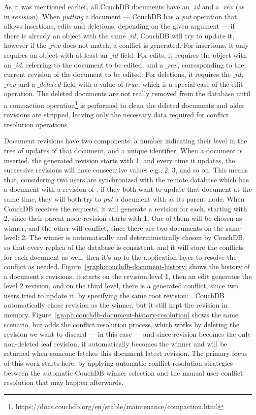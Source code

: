 As it was mentioned earlier, all CouchDB documents have an $\_id$ and a $\_rev$ (as in \textit{revision}). When \textit{putting} a document --- CouchDB has a \textit{put} operation that allows insertions, edits and deletions, depending on the given argument --- if there is already an object with the same $\_id$, CouchDB will try to update it, however if the $\_rev$ does not match, a conflict is generated. For insertions, it only requires an object with at least an $\_id$ field. For edits, it requires the object with an $\_id$, referring to the document to be edited, and a $\_rev$, corresponding to the current revision of the document to be edited. For deletions, it requires the $\_id$, $\_rev$ and a $\_deleted$ field with a value of $true$, which is a special case of the edit operation. The deleted documents are not really removed from the database until a compaction operation\footnote{https://docs.couchdb.org/en/stable/maintenance/compaction.html} is performed to clean the deleted documents and older revisions are stripped, leaving only the necessary data required for conflict resolution operations.

Document revisions have two components: a number indicating their level in the tree of updates of that document, and a unique identifier. When a document is inserted, the generated revision starts with 1, and every time it updates, the successive revisions will have consecutive values e.g., 2, 3, and so on. This means that, considering two users are synchronized with the remote database which has a document with a revision of , if they both want to update that document at the same time, they will both try to \textit{put} a document with  as its parent node. When CouchDB receives the requests, it will generate a revision for each, starting with 2, since their parent node revision starts with 1. One of them will be chosen as winner, and the other will conflict, since there are two documents on the same level: 2. The winner is automatically and deterministically chosen by CouchDB, so that every replica of the database is consistent, and it will store the conflicts for each document as well, then it's up to the application layer to resolve the conflict as needed. Figure~\ref{graph:couchdb-document-history} shows the history of a document's revisions, it starts on the revision level 1, then an edit generates the level 2 revision, and on the third level, there is a generated conflict, since two users tried to update it, by specifying the same root revision: . CouchDB automatically chose revision  as the winner, but it still kept the  revision in memory. Figure~\ref{graph:couchdb-document-history-resolution} shows the same scenario, but adds the conflict resolution process, which works by deleting the revision we want to discard ---  in this case --- and since revision  becomes the only non-deleted leaf revision, it automatically becomes the winner and will be returned when someone fetches this document latest revision. The primary focus of this work starts here, by applying automatic conflict resolution strategies between the automatic CouchDB winner selection and the manual user conflict resolution that may happen afterwards.

